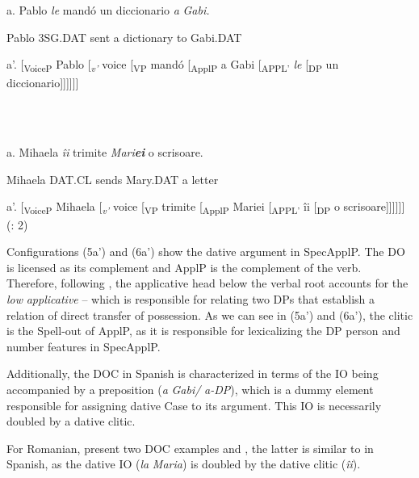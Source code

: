 \documentclass[output=paper,modfonts,nonflat]{langsci/langscibook}
\begin{document}
\ea%
    \label{ex:key:4}
    \gll\\
        \\
    \glt
    \z

         a. Pablo \textit{le}               mandó un diccionario  \textit{a} \textit{Gabi.} 

           Pablo 3SG.DAT  sent      a dictionary     to Gabi.DAT 

       a’. [\textsubscript{VoiceP} Pablo [\textit{\textsubscript{v’}} voice [\textsubscript{VP} mandó [\textsubscript{ApplP} a Gabi [\textsubscript{APPL’} \textit{le} [\textsubscript{DP} un diccionario]]]]]]                        \citep[35]{Cuervo2003} 

\ea%
    \label{ex:key:5}
    \gll\\
        \\
    \glt
    \z

         a. Mihaela  \textit{îi}             trimite   \textit{Mari}\textbf{\textit{ei}        }o scrisoare. 

           Mihaela  DAT.CL  sends   Mary.DAT  a letter 

        a'. [\textsubscript{VoiceP} Mihaela [\textit{\textsubscript{v’}} voice [\textsubscript{VP} trimite [\textsubscript{ApplP} Mariei [\textsubscript{APPL’} îi [\textsubscript{DP} o scrisoare]]]]]]                       (\citealt{DiaconescuRivero2007}: 2) 

Configurations (5a’) and (6a’) show the dative argument in SpecApplP. The DO is licensed as its complement and ApplP is the complement of the verb. Therefore, following \citet{Pylkkänen2002}, the applicative head below the verbal root accounts for the \textit{low} \textit{applicative} – which is responsible for relating two DPs that establish a relation of direct transfer of possession. As we can see in (5a’) and (6a’), the clitic is the Spell-out of ApplP, as it is responsible for lexicalizing the DP person and number features in SpecApplP. 

Additionally, the DOC in Spanish is characterized in terms of the IO being accompanied by a preposition (\textit{a} \textit{Gabi/} \textit{a-DP}), which is a dummy element responsible for assigning dative Case to its argument. This IO is necessarily doubled by a dative clitic. 

For Romanian, \citet{DiaconescuRivero2007} present two DOC examples  and , the latter is similar to  in Spanish, as the dative IO (\textit{la} \textit{Maria}) is doubled by the dative clitic (\textit{îi}).
\end{document}
